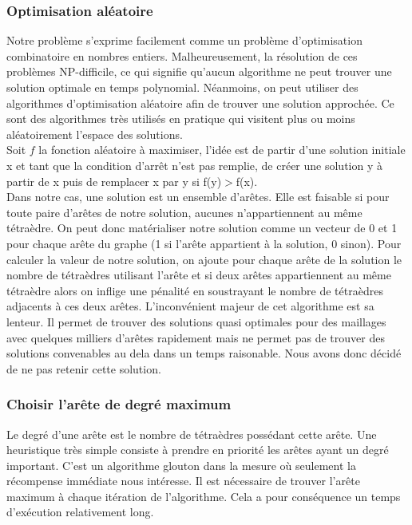 \subsubsection{Optimisation aléatoire}
\noindent
Notre problème s'exprime facilement comme un problème d'optimisation combinatoire en nombres entiers. Malheureusement, la résolution de ces problèmes NP-difficile, ce qui signifie qu'aucun algorithme ne peut trouver une solution optimale en temps polynomial. Néanmoins, on peut utiliser des algorithmes d'optimisation aléatoire afin de trouver une solution approchée. Ce sont des algorithmes très utilisés en pratique qui visitent plus ou moins aléatoirement l'espace des solutions.\\
Soit $f$ la fonction aléatoire à maximiser, l'idée est de partir d'une solution initiale x et tant que la condition d'arrêt n'est pas remplie, de créer une solution y à partir de x puis de remplacer x par y si f(y)$>$f(x).\\
Dans notre cas, une solution est un ensemble d'arêtes. Elle est faisable si pour toute paire d'arêtes de notre solution, aucunes n'appartiennent au même tétraèdre. On peut donc matérialiser notre solution comme un vecteur de 0 et 1 pour chaque arête du graphe (1 si l'arête appartient à la solution, 0 sinon). Pour calculer la valeur de notre solution, on ajoute pour chaque arête de la solution le nombre de tétraèdres utilisant l'arête et si deux arêtes appartiennent au même tétraèdre alors on inflige une pénalité en soustrayant le nombre de tétraèdres adjacents à ces deux arêtes. L'inconvénient majeur de cet algorithme est sa lenteur. Il permet de trouver des solutions quasi optimales pour des maillages avec quelques milliers d'arêtes rapidement mais ne permet pas de trouver des solutions convenables au dela dans un temps raisonable. Nous avons donc décidé de ne pas retenir cette solution.

\subsubsection{Choisir l'arête de degré maximum}
\noindent
Le degré d'une arête est le nombre de tétraèdres possédant cette arête. Une heuristique très simple consiste à prendre en priorité les arêtes ayant un degré important. C'est un algorithme glouton dans la mesure où seulement la récompense immédiate nous intéresse. Il est nécessaire de trouver l'arête maximum à chaque itération de l'algorithme. Cela a pour conséquence un temps d'exécution relativement long.
